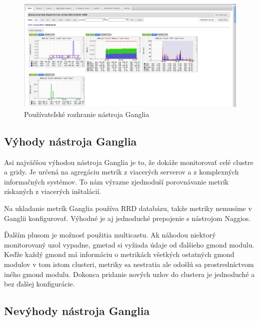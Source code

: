\documentclass[a4paper, upjsfrontpage, disablespecwarning, thesismargins, thesislinespacing]{rnthesis}
\begin{document}
\begin{figure}
	\begin{center}
		\includegraphics[scale=0.41]{ganglia.png}
	\end{center}
	\caption{Používateľské rozhranie nástroja Ganglia}
\end{figure}

\subsection{Výhody nástroja Ganglia}

Asi najväčšou výhodou nástroja Ganglia je to, že dokáže monitorovať celé clustre a gridy.
Je určená na agregáciu metrík z viacerých serverov a z komplexných informačných systémov.
To nám výrazne zjednoduší porovnávanie metrík získaných z viacerých inštalácií.

Na ukladanie metrík Ganglia používa RRD databázu, takže metriky nemusíme v Ganglii konfigurovať.
Výhodné je aj jednoduché prepojenie s nástrojom Naggios.

Ďalším plusom je možnosť použitia multicastu.
Ak náhodou niektorý monitorovaný uzol vypadne, gmetad si vyžiada údaje od ďalšieho gmond modulu.
Keďže každý gmond má informáciu o metrikách všetkých ostatných gmond modulov v tom istom clusteri,
metriky sa nestratia ale odošlú sa prostredníctvom iného gmond modulu. 
Dokonca pridanie nových uzlov do clustera je jednoduché a bez ďalšej konfigurácie.

\subsection{Nevýhody nástroja Ganglia}
\end{document}
